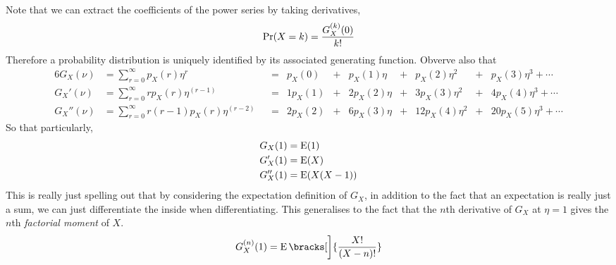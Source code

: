 Note that we can extract the coefficients of the power series by taking
derivatives,
\begin{equation*}
 \operatorname{Pr}(X = k) = \frac{G_X^{(k)}(0)}{k!}
\end{equation*}
Therefore a probability distribution is uniquely identified by its associated
generating function. Obverve also that
\begin{alignat*}6
 G_X(\nu) &= \sum_{r = 0}^\infty p_X(r)\eta^r
     &&={}& p_X(0) &+{}& p_X(1)\eta
     &+{}& p_X(2)\eta^2 &+{}& p_X(3) \eta^3 + \dotsb \\
 G_X'(\nu) &= \sum_{r = 0}^\infty rp_X(r)\eta^{(r - 1)}
     &&={}& 1 p_X(1) &+{}& 2p_X(2)\eta
     &+{}& 3p_X(3) \eta^2 &+{}& 4p_X(4) \eta^3 + \dotsb \\
 G_X''(\nu) &= \sum_{r = 0}^\infty r(r - 1)p_X(r)\eta^{(r - 2)}
     &&={}& 2 p_X(2) &+{}& 6p_X(3)\eta
     &+{}& 12p_X(4) \eta^2 &+{}& 20p_X(5) \eta^3 + \dotsb
\end{alignat*}
So that particularly,
\begin{align*}
 G_X(1) &= \operatorname{E}(1) \\
 G_X'(1) &= \operatorname{E}(X) \\
 G_X''(1) &= \operatorname{E}(X(X - 1))
\end{align*}
This is really just spelling out that by considering the expectation definition
of \(G_X\), in addition to the fact that an expectation is really just a sum, we
can just differentiate the inside when differentiating. This generalises to the
fact that the \(n\)th derivative of \(G_X\) at \(\eta = 1\) gives the \(n\)th
\emph{factorial moment} of \(X\).
\begin{equation*}
 G_X^{(n)}(1) = \Expect\bracks[\bigg]{\frac{X!}{(X - n)!}}
\end{equation*}

